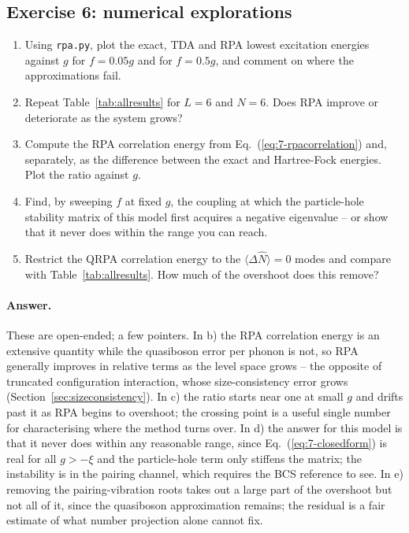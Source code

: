 \subsection*{Exercise 6: numerical explorations}
\label{ex:7-numerical}

\begin{enumerate}
  \item[a)] Using \texttt{rpa.py}, plot the exact, TDA and RPA lowest
  excitation energies against $g$ for $f=0.05g$ and for $f=0.5g$, and comment
  on where the approximations fail.
  \item[b)] Repeat Table~\ref{tab:allresults} for $L=6$ and $N=6$.  Does
  RPA improve or deteriorate as the system grows?
  \item[c)] Compute the RPA correlation energy from
  Eq.~(\ref{eq:7-rpacorrelation}) and, separately, as the difference between
  the exact and Hartree-Fock energies.  Plot the ratio against $g$.
  \item[d)] Find, by sweeping $f$ at fixed $g$, the coupling at which the
  particle-hole stability matrix of this model first acquires a negative
  eigenvalue -- or show that it never does within the range you can reach.
  \item[e)] Restrict the QRPA correlation energy to the
  $\langle\Delta\hat{N}\rangle=0$ modes and compare with
  Table~\ref{tab:allresults}.  How much of the overshoot does this remove?
\end{enumerate}

\paragraph{Answer.}
These are open-ended; a few pointers.  In b) the RPA correlation energy is an
extensive quantity while the quasiboson error per phonon is not, so RPA
generally improves in relative terms as the level space grows -- the opposite
of truncated configuration interaction, whose size-consistency error grows
(Section~\ref{sec:sizeconsistency}).  In c) the ratio starts near one at small
$g$ and drifts past it as RPA begins to overshoot; the crossing point is a
useful single number for characterising where the method turns over.  In d)
the answer for this model is that it never does within any reasonable range,
since Eq.~(\ref{eq:7-closedform}) is real for all $g>-\xi$ and the
particle-hole term only stiffens the matrix; the instability is in the pairing
channel, which requires the BCS reference to see.  In e) removing the
pairing-vibration roots takes out a large part of the overshoot but not all of
it, since the quasiboson approximation remains; the residual is a fair
estimate of what number projection alone cannot fix.
